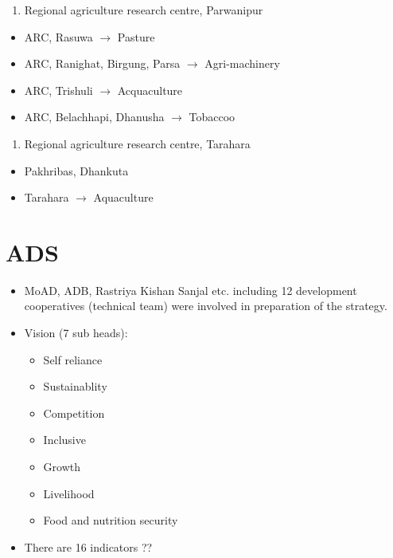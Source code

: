 \documentclass[
]{book}
\providecommand{\tightlist}{%
  \setlength{\itemsep}{0pt}\setlength{\parskip}{0pt}}
\begin{document}
\begin{enumerate}
\def\labelenumi{\arabic{enumi}.}
\setcounter{enumi}{2}
\tightlist
\item
  Regional agriculture research centre, Parwanipur
\end{enumerate}

\begin{itemize}
\tightlist
\item
  ARC, Rasuwa \(\rightarrow\) Pasture
\item
  ARC, Ranighat, Birgung, Parsa \(\rightarrow\) Agri-machinery
\item
  ARC, Trishuli \(\rightarrow\) Acquaculture
\item
  ARC, Belachhapi, Dhanusha \(\rightarrow\) Tobaccoo
\end{itemize}

\begin{enumerate}
\def\labelenumi{\arabic{enumi}.}
\setcounter{enumi}{3}
\tightlist
\item
  Regional agriculture research centre, Tarahara
\end{enumerate}

\begin{itemize}
\tightlist
\item
  Pakhribas, Dhankuta
\item
  Tarahara \(\rightarrow\) Aquaculture
\end{itemize}

\hypertarget{ads}{%
\section{ADS}\label{ads}}

\begin{itemize}
\tightlist
\item
  MoAD, ADB, Rastriya Kishan Sanjal etc. including 12 development cooperatives (technical team) were involved in preparation of the strategy.
\item
  Vision (7 sub heads):

  \begin{itemize}
  \tightlist
  \item
    Self reliance
  \item
    Sustainablity
  \item
    Competition
  \item
    Inclusive
  \item
    Growth
  \item
    Livelihood
  \item
    Food and nutrition security
  \end{itemize}
\item
  There are 16 indicators ??
\end{itemize}
\end{document}
